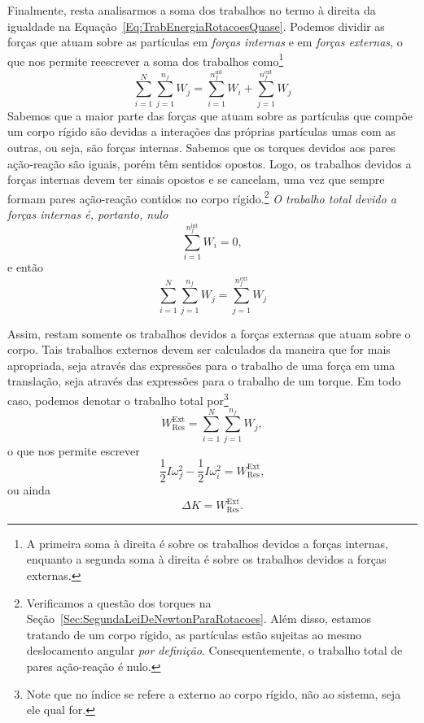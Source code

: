 Finalmente, resta analisarmos a soma dos trabalhos no termo à direita da igualdade na Equação~\eqref{Eq:TrabEnergiaRotacoesQuase}. Podemos dividir as forças que atuam sobre as partículas em \emph{forças internas} e em \emph{forças externas}, o que nos permite reescrever a soma dos trabalhos como\footnote{A primeira soma à direita é sobre os trabalhos devidos a forças internas, enquanto a segunda soma à direita é sobre os trabalhos devidos a forças externas.}
\begin{equation}
    \sum_{i = 1}^N\sum_{j=1}^{n_f} W_j = \sum_{i = 1}^{n_f^{\text{int}}} W_i + \sum_{j = 1}^{n_f^{\text{ext}}} W_j
\end{equation}
%
 Sabemos que a maior parte das forças que atuam sobre as partículas que compõe um corpo rígido são devidas a interações das próprias partículas umas com as outras, ou seja, são forças internas. Sabemos que os torques devidos aos pares ação-reação são iguais, porém têm sentidos opostos. Logo, os trabalhos devidos a forças internas devem ter sinais opostos e se cancelam, uma vez que sempre formam pares ação-reação contidos no corpo rígido.\footnote[][1cm]{Verificamos a questão dos torques na Seção~\ref{Sec:SegundaLeiDeNewtonParaRotacoes}. Além disso, estamos tratando de um corpo rígido, as partículas estão sujeitas ao mesmo deslocamento angular \emph{por definição}. Consequentemente, o trabalho total de pares ação-reação é nulo.} \emph{O trabalho total devido a forças internas é, portanto, nulo} 
 \begin{equation}
    \sum_{i = 1}^{n_f^{\text{int}}} W_i = 0,
 \end{equation}
 e então
 \begin{equation}
    \sum_{i = 1}^N\sum_{j=1}^{n_f} W_j = \sum_{j = 1}^{n_f^{\text{ext}}} W_j
 \end{equation}
 
 Assim, restam somente os trabalhos devidos a forças externas que atuam sobre o corpo. Tais trabalhos externos devem ser calculados da maneira que for mais apropriada, seja através das expressões para o trabalho de uma força em uma translação, seja através das expressões para o trabalho de um torque. Em todo caso, podemos denotar o trabalho total por\footnote{Note que no índice se refere a externo ao corpo rígido, não ao sistema, seja ele qual for.}
\begin{equation}
    W_{\text{Res}}^{\text{Ext}} = \sum_{i = 1}^N\sum_{j=1}^{n_f} W_j,
\end{equation}
%
o que nos permite escrever
\begin{equation}
    \frac{1}{2}I\omega_f^2 - \frac{1}{2}I\omega_i^2 = W_{\text{Res}}^{\text{Ext}},
\end{equation}
%
ou ainda
\begin{equation}
    \Delta K = W_{\text{Res}}^{\text{Ext}}.
\end{equation}




